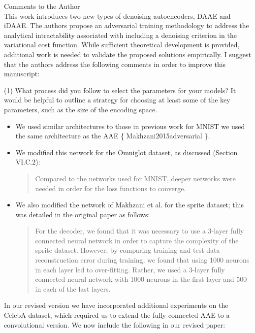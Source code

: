 \documentclass[a4paper,11pt]{article}
\begin{document}
Comments to the Author
{\color{blue}\\
This work introduces two new types of denoising autoencoders, DAAE and iDAAE. The authors propose an adversarial training methodology to address the analytical intractability associated with including a denoising criterion in the variational cost function. While sufficient theoretical development is provided, additional work is needed to validate the proposed solutions empirically. I suggest that the authors address the following comments in order to improve this manuscript:}\newline

{\color{blue}
(1) What process did you follow to select the parameters for your models? It would be helpful to outline a strategy for choosing at least some of the key parameters, such as the size of the encoding space. }\newline
\begin{itemize}
    \item We used similar architectures to those in previous work for MNIST we used the same architecture as the AAE \{ Makhzani2015adversarial \}.
    \item We modified this network for the Omniglot dataset, as discussed (Section VI.C.2):
    \begin{quote}
        Compared  to  the  networks  used  for  MNIST,  deeper networks  were  needed  in  order  for  the  loss  functions  to converge.
    \end{quote}
    \item We also modified the network of Makhzani et al. for the sprite dataset; this was detailed in the original paper as follows:
    \begin{quote}
        For  the  decoder,  we  found  that  it  was  necessary  to  use  a 3-layer  fully  connected  neural  network  in  order  to  capture the  complexity  of  the  sprite  dataset.  However,  by  comparing training and test data reconstruction error during training, we found that using 1000 neurons in each layer led to over-fitting. Rather, we used a 3-layer fully connected neural network with 1000 neurons  in  the  first  layer  and 500 in  each  of  the  last layers.
    \end{quote}
    
\end{itemize}


In our revised version we have incorporated additional experiments on the CelebA dataset, which required us to extend the fully connected AAE to a convolutional version. We now include the following in our revised paper:
\end{document}
